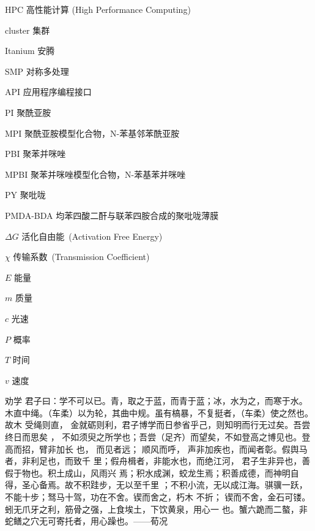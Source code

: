 \begin{denotation}[2.5cm]
\item[HPC] 高性能计算 (High Performance Computing)
\item[cluster] 集群
\item[Itanium] 安腾
\item[SMP] 对称多处理
\item[API] 应用程序编程接口
\item[PI]	聚酰亚胺
\item[MPI]	聚酰亚胺模型化合物，N-苯基邻苯酰亚胺
\item[PBI]	聚苯并咪唑
\item[MPBI]	聚苯并咪唑模型化合物，N-苯基苯并咪唑
\item[PY]	聚吡咙
\item[PMDA-BDA]	均苯四酸二酐与联苯四胺合成的聚吡咙薄膜
\item[$\Delta G$]  	活化自由能~(Activation Free Energy)
\item [$\chi$] 传输系数~(Transmission Coefficient)
\item[$E$] 能量
\item[$m$] 质量
\item[$c$] 光速
\item[$P$] 概率
\item[$T$] 时间
\item[$v$] 速度
\item[劝学] 君子曰：学不可以已。青，取之于蓝，而青于蓝；冰，水为之，而寒于水。
木直中绳。（车柔）以为轮，其曲中规。虽有槁暴，不复挺者，（车柔）使之然也。故木
受绳则直， 金就砺则利，君子博学而日参省乎己，则知明而行无过矣。吾尝终日而思矣
，  不如须臾之所学也；吾尝（足齐）而望矣，不如登高之博见也。登高而招，臂非加长
也，  而见者远；  顺风而呼，  声非加疾也，而闻者彰。假舆马者，非利足也，而致千
里；假舟楫者，非能水也，而绝江河，  君子生非异也，善假于物也。积土成山，风雨兴
焉；积水成渊，蛟龙生焉；积善成德，而神明自得，圣心备焉。故不积跬步，无以至千里
；不积小流，无以成江海。骐骥一跃，不能十步；驽马十驾，功在不舍。锲而舍之，朽木
不折；  锲而不舍，金石可镂。蚓无爪牙之利，筋骨之强，上食埃土，下饮黄泉，用心一
也。蟹六跪而二螯，非蛇鳝之穴无可寄托者，用心躁也。——荀况
\end{denotation}